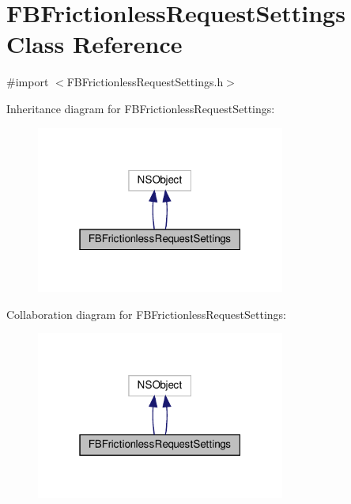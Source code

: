 \hypertarget{interfaceFBFrictionlessRequestSettings}{}\section{F\+B\+Frictionless\+Request\+Settings Class Reference}
\label{interfaceFBFrictionlessRequestSettings}


{\ttfamily \#import $<$F\+B\+Frictionless\+Request\+Settings.\+h$>$}



Inheritance diagram for F\+B\+Frictionless\+Request\+Settings\+:
\nopagebreak
\begin{figure}[H]
\begin{center}
\leavevmode
\includegraphics[width=232pt]{interfaceFBFrictionlessRequestSettings__inherit__graph}
\end{center}
\end{figure}


Collaboration diagram for F\+B\+Frictionless\+Request\+Settings\+:
\nopagebreak
\begin{figure}[H]
\begin{center}
\leavevmode
\includegraphics[width=232pt]{interfaceFBFrictionlessRequestSettings__coll__graph}
\end{center}
\end{figure}

